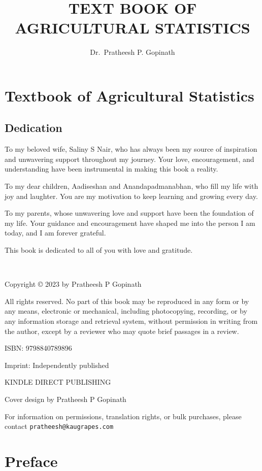 \documentclass[
]{book}
\title{TEXT BOOK OF AGRICULTURAL STATISTICS}
\author{Dr.~Pratheesh P. Gopinath}
\date{}
\begin{document}
\maketitle

{
\setcounter{tocdepth}{1}
\tableofcontents
}
\hypertarget{textbook-of-agricultural-statistics}{%
\chapter*{Textbook of Agricultural Statistics}\label{textbook-of-agricultural-statistics}}

\hypertarget{dedication}{%
\section*{Dedication}\label{dedication}}

To my beloved wife, Saliny S Nair, who has always been my source of inspiration and unwavering support throughout my journey. Your love, encouragement, and understanding have been instrumental in making this book a reality.

To my dear children, Aadiseshan and Anandapadmanabhan, who fill my life with joy and laughter. You are my motivation to keep learning and growing every day.

To my parents, whose unwavering love and support have been the foundation of my life. Your guidance and encouragement have shaped me into the person I am today, and I am forever grateful.

This book is dedicated to all of you with love and gratitude.

~

Copyright © 2023 by Pratheesh P Gopinath

All rights reserved. No part of this book may be reproduced in any form or by any means, electronic or mechanical, including photocopying, recording, or by any information storage and retrieval system, without permission in writing from the author, except by a reviewer who may quote brief passages in a review.

ISBN: 9798840789896

Imprint: Independently published

KINDLE DIRECT PUBLISHING

Cover design by Pratheesh P Gopinath

For information on permissions, translation rights, or bulk purchases, please contact \texttt{pratheesh@kaugrapes.com}

\hypertarget{preface}{%
\chapter*{Preface}\label{preface}}
\end{document}
